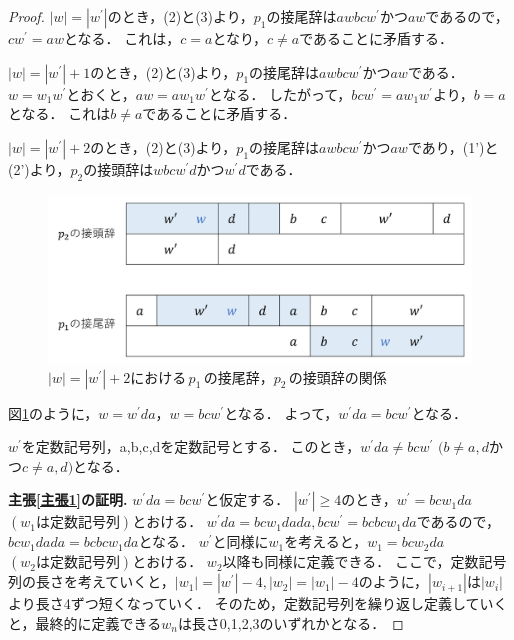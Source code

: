 \begin{proof}
$|w|=|w^{\prime}|$のとき，(2)と(3)より，$p_{1}$の接尾辞は$awbcw^{\prime}$かつ$aw$であるので，$cw^{\prime}=aw$となる．
これは，$c=a$となり，$c \not = a$であることに矛盾する．

$|w| = |w^{\prime}|+1$のとき，(2)と(3)より，$p_{1}$の接尾辞は$awbcw^{\prime}$かつ$aw$である．
$w=w_{1}w^{\prime}$とおくと，$aw=aw_{1}w^{\prime}$となる．
したがって，$bcw^{\prime}=aw_{1}w^{\prime}$より，$b = a$となる．
これは$b \not = a$であることに矛盾する．

$|w| = |w^{\prime}|+2$のとき，(2)と(3)より，$p_{1}$の接尾辞は$awbcw^{\prime}$かつ$aw$であり，(1')と(2')より，$p_{2}$の接頭辞は$wbcw^{\prime}d$かつ$w^{\prime}d$である．

\begin{figure}  
\centering
\includegraphics[width=\linewidth]{画像/追加部分1.png}
\vspace{-1cm}
\caption{$|w| = |w^{\prime}|+2$における\,$p_{1}$\,の接尾辞，$p_{2}$\,の接頭辞の関係}
\label{追加部分1}
\vspace*{-.2cm}
\end{figure}

図\ref{追加部分1}のように，$w=w^{\prime}da，w=bcw^{\prime}$となる．
よって，$w^{\prime}da=bcw^{\prime}$となる．

\begin{cl}\label{主張1}
$w^{\prime}$を定数記号列，a,b,c,dを定数記号とする．
このとき，$w^{\prime}da \not =bcw^{\prime}$ $(b \not = a,d$かつ$c \not = a,d)$となる．
\end{cl}

\noindent\textbf{主張\ref{主張1}の証明.}
$w^{\prime}da=bcw^{\prime}$と仮定する．
$|w^{\prime}| \ge 4$のとき，$w^{\prime}=bcw_{1}da$ $(w_{1}は定数記号列)$とおける．
$w^{\prime}da=bcw_{1}dada, bcw^{\prime}=bcbcw_{1}da$であるので，$bcw_{1}dada=bcbcw_{1}da$となる．
$w^{\prime}$と同様に$w_{1}$を考えると，$w_{1}=bcw_{2}da$ $(w_{2}は定数記号列)$とおける．
$w_{2}$以降も同様に定義できる．
ここで，定数記号列の長さを考えていくと，$|w_{1}|=|w^{\prime}|-4, |w_{2}|=|w_{1}|-4$のように，$|w_{i+1}|$は$|w_{i}|$より長さ4ずつ短くなっていく．
そのため，定数記号列を繰り返し定義していくと，最終的に定義できる$w_{n}$は長さ0,1,2,3のいずれかとなる．


\end{proof}
